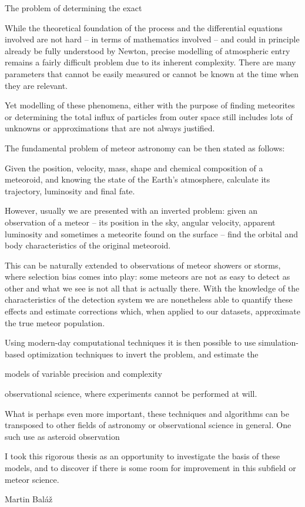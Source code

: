 

The problem of determining the exact

While the theoretical foundation of the process and the differential equations involved
are not hard -- in terms of mathematics involved -- and could in principle already be fully understood by Newton,
precise modelling of atmospheric entry remains a fairly difficult problem due to its inherent complexity.
There are many parameters that cannot be easily measured or cannot be known at the time when they are relevant.

Yet modelling of these phenomena, either with the purpose of finding meteorites
or determining the total influx of particles from outer space
still includes lots of unknowns or approximations that are not always justified.

The fundamental problem of meteor astronomy can be then stated as follows:

Given the position, velocity, mass, shape and chemical composition of a meteoroid,
and knowing the state of the Earth's atmosphere, calculate its trajectory, luminosity and final fate.

However, usually we are presented with an inverted problem: given an observation of a
meteor -- its position in the sky, angular velocity, apparent luminosity and sometimes
a meteorite found on the surface -- find the orbital and body characteristics of the original meteoroid.

This can be naturally extended to observations of meteor showers or storms,
where selection bias comes into play: some meteors are not as easy to detect as other
and what we see is not all that is actually there. With the knowledge of the characteristics
of the detection system we are nonetheless able to quantify these effects and estimate
corrections which, when applied to our datasets, approximate the true meteor population.

Using modern-day computational techniques it is then possible to use simulation-based optimization
techniques to invert the problem, and estimate the 

models of variable precision and complexity

observational science, where experiments cannot be performed at will.

What is perhaps even more important, these techniques and algorithms can be transposed to other fields
of astronomy or observational science in general. One such use as asteroid observation 


I took this rigorous thesis as an opportunity to investigate the basis
of these models, and to discover if there is some room for improvement
in this subfield or meteor science.

\hfill Martin Baláž
